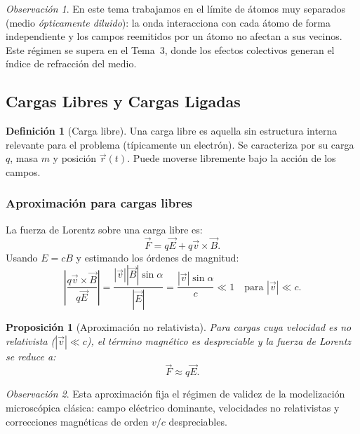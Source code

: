 \documentclass[12pt, a4paper]{article}
\theoremstyle{plain}
\newtheorem{proposicion}[teorema]{Proposición}
\theoremstyle{definition}
\newtheorem{definicion}[teorema]{Definición}
\theoremstyle{remark}
\newtheorem*{observacion}{Observación}
\newcommand{\ve}[1]{\vec{#1}}
\begin{document}
\begin{observacion}
En este tema trabajamos en el límite de átomos muy separados (medio
\emph{ópticamente diluido}): la onda interacciona con cada átomo de forma
independiente y los campos reemitidos por un átomo no afectan a sus vecinos.
Este régimen se supera en el Tema~3, donde los efectos colectivos generan
el índice de refracción del medio.
\end{observacion}

\subsection{Cargas Libres y Cargas Ligadas}

\begin{definicion}[Carga libre]
Una carga libre es aquella sin estructura interna relevante para el problema
(típicamente un electrón). Se caracteriza por su carga $q$, masa $m$ y
posición $\ve{r}(t)$. Puede moverse libremente bajo la acción de los campos.
\end{definicion}

\subsubsection{Aproximación para cargas libres}

La fuerza de Lorentz sobre una carga libre es:
\[
  \ve{F} = q\ve{E} + q\ve{v}\times\ve{B}.
\]
Usando $E = c B$ y estimando los órdenes de magnitud:
\[
  \left|\frac{q\ve{v}\times\ve{B}}{q\ve{E}}\right|
  = \frac{|\ve{v}||\ve{B}|\sin\alpha}{|\ve{E}|}
  = \frac{|\ve{v}|\sin\alpha}{c} \ll 1
  \quad \text{para } |\ve{v}| \ll c.
\]

\begin{proposicion}[Aproximación no relativista]
Para cargas cuya velocidad es no relativista ($|\ve{v}|\ll c$), el término
magnético es despreciable y la fuerza de Lorentz se reduce a:
\begin{equation}
  \ve{F} \approx q\ve{E}. \label{eq:fuerza_libre}
\end{equation}
\end{proposicion}

\begin{observacion}
Esta aproximación fija el régimen de validez de la modelización microscópica
clásica: campo eléctrico dominante, velocidades no relativistas y correcciones
magnéticas de orden $v/c$ despreciables.
\end{observacion}
\end{document}
